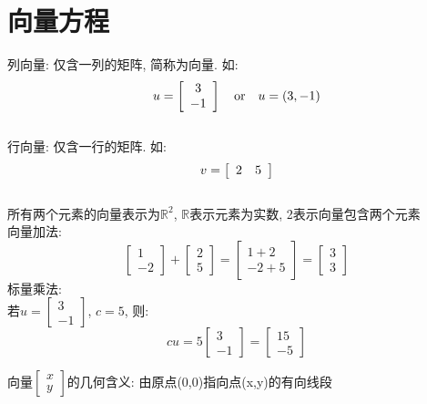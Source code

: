\section{向量方程}
列向量: 仅含一列的矩阵, 简称为向量. 如:
\[u=\left[\begin{array}{c}
	3\\
	-1
\end{array}\right] \text{\quad or\quad} u=(3, -1)\]\\[2ex]
行向量: 仅含一行的矩阵. 如:
\[v=\left[\begin{array}{c c}
	2 & 5
\end{array}\right]\]\\[2ex]
所有两个元素的向量表示为$\mathbb{R}^2$, $\mathbb{R}$表示元素为实数, 2表示向量包含两个元素\\
向量加法:
\begin{equation*}
\left[\begin{array}{c}
	1\\
	-2
\end{array}\right]
+
\left[\begin{array}{c}
	2\\
	5
\end{array}\right]
=
\left[\begin{array}{c}
	1+2\\
	-2+5
\end{array}\right]
=
\left[\begin{array}{c}
	3\\
	3
\end{array}\right]
\end{equation*}
标量乘法:\\
\indent 若$u=\left[\begin{array}{c}3\\-1\end{array}\right]$, $c=5$, 则:
\[cu=5\left[\begin{array}{c}3\\-1\end{array}\right]=\left[\begin{array}{c}15\\-5\end{array}\right]\]

向量$\left[\begin{array}{r}x\\y\end{array}\right]$的几何含义: 由原点(0,0)指向点(x,y)的有向线段\\[2ex]

